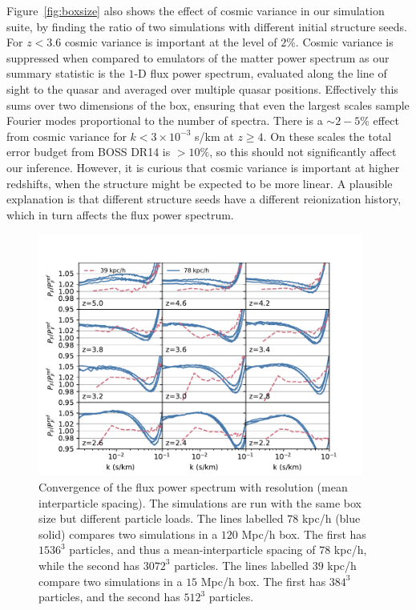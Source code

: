 \documentclass[a4paper,11pt]{article}
\begin{document}
Figure~\ref{fig:boxsize} also shows the effect of cosmic variance in our simulation suite, by finding the ratio of two simulations with different initial structure seeds. For $z < 3.6$ cosmic variance is important at the level of $2\%$. Cosmic variance is suppressed when compared to emulators of the matter power spectrum as our summary statistic is the $1$-D flux power spectrum, evaluated along the line of sight to the quasar and averaged over multiple quasar positions. Effectively this sums over two dimensions of the box, ensuring that even the largest scales sample Fourier modes proportional to the number of spectra. There is a $\sim 2-5\%$ effect from cosmic variance for $k < 3 \times 10^{-3}$ s/km at $z \geq 4$. On these scales the total error budget from BOSS DR14 is $> 10\%$, so this should not significantly affect our inference. However, it is curious that cosmic variance is important at higher redshifts, when the structure might be expected to be more linear. A plausible explanation is that different structure seeds have a different reionization history, which in turn affects the flux power spectrum.

\begin{figure}
\includegraphics[width=0.95\textwidth,trim={0 0 1cm 0},clip]{figures/resolution-convergence.pdf}
 \caption{Convergence of the flux power spectrum with resolution (mean interparticle spacing). The simulations are run with the same box size but different particle loads. The lines labelled $78$ kpc/h (blue solid) compares two simulations in a $120$ Mpc/h box. The first has $1536^3$ particles, and thus a mean-interparticle spacing of $78$ kpc/h, while the second has $3072^3$ particles. The lines labelled $39$ kpc/h compare two simulations in a $15$ Mpc/h box. The first has $384^3$ particles, and the second has $512^3$ particles.}
 \label{fig:resolution}
\end{figure}
\end{document}

